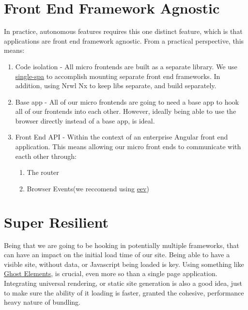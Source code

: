 \section{Front End Framework Agnostic}
In practice, autonomous features requires this one distinct feature, which is that applications are front end framework agnostic. From a practical perspective, this means:

\begin{enumerate}
  \item Code isolation - All micro frontends are built as a separate library. We use \href{github.com/CanopyTax/single-spa}{single-spa} to accomplish mounting separate front end frameworks. In addition, using Nrwl Nx to keep libs separate, and build separately.
  \item Base app - All of our micro frontends are going to need a base app to hook all of our frontends into each other. However, ideally being able to use the browser directly instead of a base app, is ideal.
  \item Front End API - Within the context of an enterprise Angular front end application. This means allowing our micro front ends to communicate with eacth other through: 
  \begin{enumerate}
    \item The router
    \item Browser Events(we reccomend using \href{github.com/chrisdavies/eev}{eev})
  \end{enumerate}
\end{enumerate} 

\section{Super Resilient}
Being that we are going to be hooking in potentially multiple frameworks, that can have an impact on the initial load time of our site. Being able to have a visible site, without data, or Javascript being loaded is key. Using something like \href{https://medium.com/angular-in-depth/https-medium-com-thomasburleson-animated-ghosts-bfc045a51fba}{Ghost Elements}, is crucial, even more so than a single page application. Integrating universal rendering, or static site generation is also a good idea, just to make sure the ability of it loading is faster, granted the cohesive, performance heavy nature of bundling.

